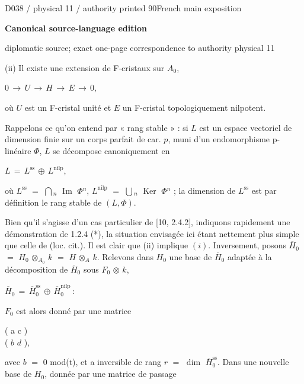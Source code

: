 \documentclass[9pt]{article}
\newcommand{\CanonText}[1]{\par{\fontsize{8.0}{9.35}\selectfont\RaggedRight #1\par}\vspace{2.2pt}}
\newcommand{\CanonDisplay}[1]{\par\vspace{1.2pt}\begin{center}{\fontsize{7.2}{8.4}\selectfont\(\displaystyle #1\)}\end{center}\vspace{1.2pt}}
\newenvironment{CanonMathBlock}{\par\vspace{1.2pt}\begin{center}\fontsize{6.8}{8.0}\selectfont\(\displaystyle}{\)\end{center}\vspace{1.2pt}}
\newcommand{\LayerTitle}{Canonical source-language edition}
\begin{document}
\noindent\begin{minipage}[t][\dimexpr\textheight-5pt\relax][t]{\textwidth}
{\sffamily\fontsize{7.3}{8.2}\selectfont\color{Quiet} D038 / physical 11 / authority printed 90\hfill French main exposition}
\par{}\vspace{4.5pt}
{\sffamily\fontsize{10.4}{11.6}\selectfont\bfseries\color{Accent} \LayerTitle}
\par{\sffamily\fontsize{6.7}{7.7}\selectfont\color{Quiet} diplomatic source; exact one-page correspondence to authority physical 11}
\vspace{5pt}
\CanonText{(ii) Il existe une extension de F-cristaux sur \(A_{0}\),}
\CanonDisplay{0\,\to{}\,U\,\to{}\,H\,\to{}\,E\,\to{}\,0,}
\CanonText{où \(U\) est un F-cristal unité et \(E\) un F-cristal topologiquement nilpotent.}
\CanonText{Rappelons ce qu'on entend par « rang stable » : si \(L\) est un espace vectoriel de dimension finie sur un corps parfait de car. \(p\), muni d'un endomorphisme p-linéaire \(\Phi{}\), \(L\) se décompose canoniquement en}
\CanonDisplay{L\,=\,L^{\mathrm{ss}}\,\oplus{}\,L^{\mathrm{nilp}},}
\CanonText{où \(L^{\mathrm{ss}}\) \(=\) \(\bigcap{}_{n}\) \(\operatorname{Im}\) \(\Phi{}^{n}\), \(L^{\mathrm{nilp}}\) \(=\) \(\bigcup{}_{n}\) \(\operatorname{Ker}\) \(\Phi{}^{n}\) ; la dimension de \(L^{\mathrm{ss}}\) est par définition le rang stable de \((L,\Phi{})\).}
\CanonText{Bien qu'il s'agisse d'un cas particulier de [10, 2.4.2], indiquons rapidement une démonstration de 1.2.4 (*), la situation envisagée ici étant nettement plus simple que celle de (loc. cit.). Il est clair que (ii) implique \((i)\). Inversement, posons \(\overline{H}_{0}\) \(=\) \(H_{0}\) \(\otimes{}_{A_{0}}\) \(k\) \(=\) \(H\) \(\otimes{}_{A}\) \(k\). Relevons dans \(H_{0}\) une base de \(\overline{H}_{0}\) adaptée à la décomposition de \(\overline{H}_{0}\) sous \(F_{0}\) \(\otimes{}\) \(k\),}
\CanonDisplay{\overline{H}_{0}\,=\,\overline{H}_{0}^{\mathrm{ss}}\,\oplus{}\,\overline{H}_{0}^{\mathrm{nilp}}\,:}
\CanonText{\(F_{0}\) est alors donné par une matrice}
\CanonText{( a c )\\( \(b\) \(d\) ),}
\CanonText{avec \(b\) \(=\) 0 mod(t), et a inversible de rang \(r\) \(=\) \(\operatorname{dim}\) \(\overline{H}_{0}^{\mathrm{ss}}\). Dans une nouvelle base de \(H_{0}\), donnée par une matrice de passage}
\begin{CanonMathBlock}
\begin{aligned}

\end{aligned}
\end{CanonMathBlock}
\end{minipage}
\end{document}
